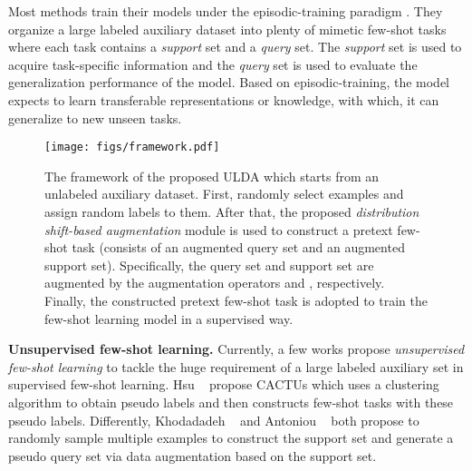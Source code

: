 \documentclass[letterpaper]{article} \usepackage{aaai21}  \usepackage{times}  \usepackage{helvet} \usepackage{courier}  \usepackage[hyphens]{url}  \usepackage{graphicx} \urlstyle{rm} \def\UrlFont{\rm}  \usepackage{natbib}  \usepackage{caption} \usepackage{url}
\begin{document}
Most methods train their models under the episodic-training paradigm \cite{Vinyals2016NIPS}. They organize a large labeled auxiliary dataset into plenty of mimetic few-shot tasks where each task contains a \emph{support} set and a \emph{query} set. The \emph{support} set is used to acquire task-specific information and the \emph{query} set is used to evaluate the generalization performance of the model. Based on episodic-training, the model expects to learn transferable representations or knowledge, with which, it can generalize to new unseen tasks.


\begin{figure*}[!t]
\vspace{-0.2cm}
\centering
\texttt{[image: figs/framework.pdf]}
\caption{The framework of the proposed ULDA which starts from an unlabeled auxiliary dataset. First, randomly select  examples and assign  random labels to them. After that, the proposed \textit{distribution shift-based augmentation} module is used to construct a pretext few-shot task (consists of an augmented query set and an augmented support set). Specifically, the query set and support set are augmented by the augmentation operators  and , respectively. Finally, the constructed pretext few-shot task is adopted to train the few-shot learning model in a supervised way.}
\label{fig:framework}
\vspace{-0.2cm}
\end{figure*}


\textbf{Unsupervised few-shot learning.}
Currently, a few works propose \emph{unsupervised few-shot learning} to tackle the huge requirement of a large labeled auxiliary set in supervised few-shot learning. Hsu \etal~\cite{Hsu2019ICLR} propose CACTUs which uses a clustering algorithm to obtain pseudo labels and then constructs few-shot tasks with these pseudo labels. Differently, Khodadadeh \etal~\cite{UMTRA2019NIPS} and Antoniou \etal~\cite{AAL2019ICML} both propose to randomly sample multiple examples to construct the support set and generate a pseudo query set via data augmentation based on the support set.
\end{document}
